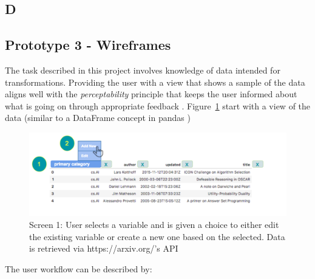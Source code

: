 \documentclass[12pt,letterpaper]{article}
\begin{document}
\subsection*{D}
\subsection*{Prototype 3 - Wireframes}
The task described in this project involves knowledge of data intended for transformations. Providing the user with a view that shows a sample of the data aligns well with the \textit{perceptability} principle that keeps the user informed about what is going on through appropriate feedback \cite{nielsen1994usability}. Figure~\ref{fig::2} start with a view of the data (similar to a DataFrame concept in pandas \cite{mckinney2011pandas})

\begin{figure}[h]
\centering
\includegraphics[scale=.3]{figures/m3/wireframe-screen1.png}
\caption{Screen 1: User selects a variable and is given a choice to either edit the existing variable or create a new one based on the selected. Data is retrieved via https://arxiv.org/'s API}
\label{fig::2}
\end{figure}

The user workflow can be described by: 
\end{document}
